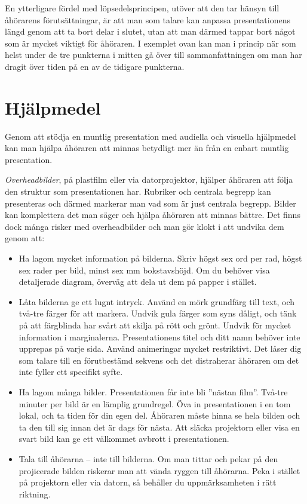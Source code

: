 En ytterligare fördel med löpsedelsprincipen, utöver att den tar hänsyn
till åhörarens förutsättningar, är att man som talare kan anpassa
presentationens längd genom att ta bort delar i slutet, utan att man
därmed tappar bort något som är mycket viktigt för åhöraren. I exemplet
ovan kan man i princip när som helst under de tre punkterna i mitten gå
över till sammanfattningen om man har dragit över tiden på en av de
tidigare punkterna.

\section{Hjälpmedel}\label{hjuxe4lpmedel}

Genom att stödja en muntlig presentation med audiella och visuella
hjälpmedel kan man hjälpa åhöraren att minnas betydligt mer än från en
enbart muntlig presentation.

\emph{Overheadbilder}, på plastfilm eller via datorprojektor, hjälper
åhöraren att följa den struktur som presentationen har. Rubriker och
centrala begrepp kan presenteras och därmed markerar man vad som är just
centrala begrepp. Bilder kan komplettera det man säger och hjälpa
åhöraren att minnas bättre. Det finns dock många risker med
overheadbilder och man gör klokt i att undvika dem genom att:

\begin{itemize}
\item
  Ha lagom mycket information på bilderna. Skriv högst sex ord per rad,
  högst sex rader per bild, minst sex mm bokstavshöjd. Om du behöver
  visa detaljerade diagram, överväg att dela ut dem på papper i stället.
\item
  Låta bilderna ge ett lugnt intryck. Använd en mörk grundfärg till
  text, och två-tre färger för att markera. Undvik gula färger som syns
  dåligt, och tänk på att färgblinda har svårt att skilja på rött och
  grönt. Undvik för mycket information i marginalerna. Presentationens
  titel och ditt namn behöver inte upprepas på varje sida. Använd
  animeringar mycket restriktivt. Det låser dig som talare till en
  förutbestämd sekvens och det distraherar åhöraren om det inte fyller
  ett specifikt syfte.
\item
  Ha lagom många bilder. Presentationen får inte bli ''nästan film''.
  Två-tre minuter per bild är en lämplig grundregel. Öva in
  presentationen i en tom lokal, och ta tiden för din egen del. Åhöraren
  måste hinna se hela bilden och ta den till sig innan det är dags för
  nästa. Att släcka projektorn eller visa en svart bild kan ge ett
  välkommet avbrott i presentationen.
\item
  Tala till åhörarna -- inte till bilderna. Om man tittar och pekar på
  den projicerade bilden riskerar man att vända ryggen till åhörarna.
  Peka i stället på projektorn eller via datorn, så behåller du
  uppmärksamheten i rätt riktning.
\end{itemize}

